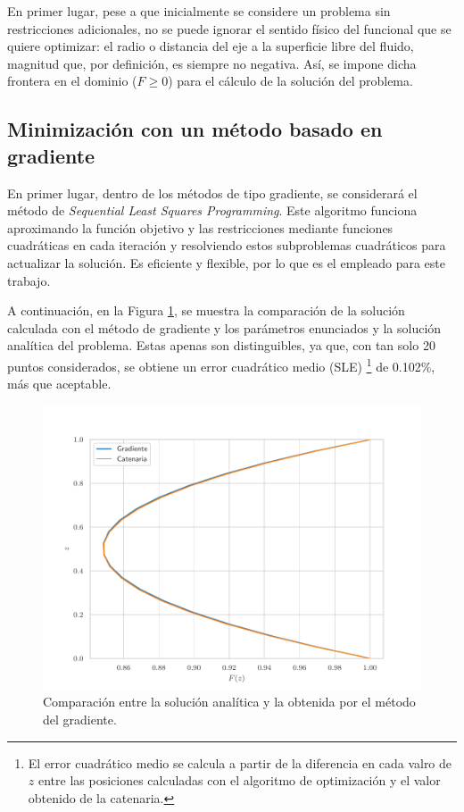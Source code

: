 En primer lugar, pese a que inicialmente se considere un problema sin restricciones adicionales, no se puede ignorar el sentido físico del funcional que se quiere optimizar: el radio o distancia del eje a la superficie libre del fluido, magnitud que, por definición, es siempre no negativa. Así, se impone dicha frontera en el dominio ($F \geq 0$) para el cálculo de la solución del problema.

\subsection{Minimización con un método basado en gradiente}

En primer lugar, dentro de los métodos de tipo gradiente, se considerará el método de \textit{Sequential Least Squares Programming}\cite{ma2024improved}. Este algoritmo funciona aproximando la función objetivo y las restricciones mediante funciones cuadráticas en cada iteración y resolviendo estos subproblemas cuadráticos para actualizar la solución. Es eficiente y flexible, por lo que es el empleado para este trabajo.

A continuación, en la Figura \ref{fig:comp_grad_cat}, se muestra la comparación de la solución calculada con el método de gradiente y los parámetros enunciados y la solución analítica del problema. Estas apenas son distinguibles, ya que, con tan solo 20 puntos considerados, se obtiene un error cuadrático medio (SLE) \footnote{El error cuadrático medio se calcula a partir de la diferencia en cada valro de $z$ entre las posiciones calculadas con el algoritmo de optimización y el valor obtenido de la catenaria.} de 0.102\%, más que aceptable.

\begin{figure}[h]
    \centering
    \includegraphics[width = 0.6 \linewidth]{Figures/01/comp_grad_cat.pdf}
    \caption{Comparación entre la solución analítica y la obtenida por el método del gradiente.}
    \label{fig:comp_grad_cat}
\end{figure}


